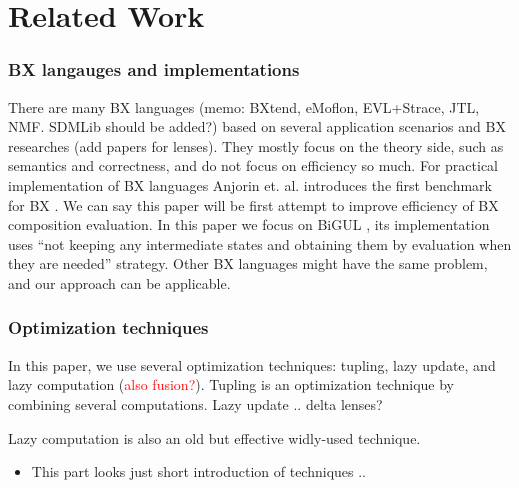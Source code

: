 \section{Related Work}

\subsubsection*{BX langauges and implementations}

There are many BX languages \cite{josh_pepm} \cite{BXtend} \cite{eMoflon} \cite{EVL+Strace} \cite{JTL} \cite{NMF} (memo: BXtend, eMoflon, EVL+Strace, JTL, NMF. SDMLib should be added?) based on several application scenarios and BX researches \cite{} (add papers for lenses). They mostly focus on the theory side, such as semantics and correctness, and do not focus on efficiency so much. For practical implementation of BX languages Anjorin et. al. introduces the first benchmark for BX \cite{BXcomp}. We can say this paper will be first attempt to improve efficiency of BX composition evaluation. In this paper we focus on BiGUL \cite{josh_pepm} \cite{josh_popl}, its implementation uses ``not keeping any intermediate states and obtaining them by evaluation when they are needed'' strategy. Other BX languages might have the same problem, and our approach can be applicable.

\subsubsection*{Optimization techniques}

In this paper, we use several optimization techniques: tupling, lazy update, and lazy computation (\textcolor{red}{also fusion?}). Tupling \cite{tupling} is an optimization technique by combining several computations.
Lazy update .. delta lenses?

Lazy computation \cite{} is also an old but effective widly-used technique.

\begin{itemize}
\item This part looks just short introduction of  techniques .. 
\end{itemize}


